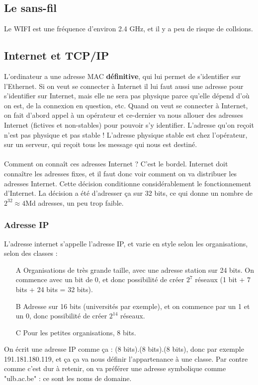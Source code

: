 \documentclass[12pt,a4paper]{report}
\begin{document}
\subsection{Le sans-fil}
Le WIFI est une fréquence d'environ 2.4 GHz, et il y a peu de risque de collsions.
\subsection{Internet et TCP/IP}
L'ordinateur a une adresse MAC \textbf{définitive}, qui lui permet de s'identifier sur l'Ethernet. Si on veut se connecter à Internet il lui faut aussi une adresse pour s'identifier sur Internet, mais elle ne sera pas physique parce qu'elle dépend d'où on est, de la connexion en question, etc. Quand on veut se connecter à Internet, on fait d'abord appel à un opérateur et ce-dernier va nous allouer des adresses Internet (fictives et non-stables) pour pouvoir s'y identifier. L'adresse qu'on reçoit n'est pas physique et pas stable ! L'adresse physique stable est chez l'opérateur, sur un serveur, qui reçoit tous les message qui nous est destiné.\\
\\
Comment on connaît ces adresses Internet ? C'est le bordel. Internet doit connaître les adresses fixes, et il faut donc voir comment on va distribuer les adresses Internet. Cette décision conditionne considérablement le fonctionnement d'Internet. La décision a été d'adresser ça sur 32 bits, ce qui donne un nombre de $2^{32} \approx 4$Md adresses, un peu trop faible.
\subsubsection{Adresse IP}
L'adresse internet s'appelle l'adresse IP, et varie en style selon les organisations, selon des classes :
\begin{itemize}
\item[A] Organisations de très grande taille, avec une adresse station sur 24 bits. On commence avec un bit de 0, et donc possibilité de créer $2^7$ réseaux (1 bit + 7 bits + 24 bits = 32 bits).
\item[B] Adresse sur 16 bits (universités par exemple), et on commence par un 1 et un 0, donc possibilité de créer $2^{14}$ réseaux.
\item[C] Pour les petites organisations, 8 bits.
\end{itemize}
On écrit une adresse IP comme ça : (8 bits).(8 bits).(8 bits), donc par exemple 191.181.180.119, et ça ça va nous définir l'appartenance à une classe. Par contre comme c'est dur à retenir, on va préférer une adresse symbolique comme "ulb.ac.be" : ce sont les noms de domaine.
\end{document}
